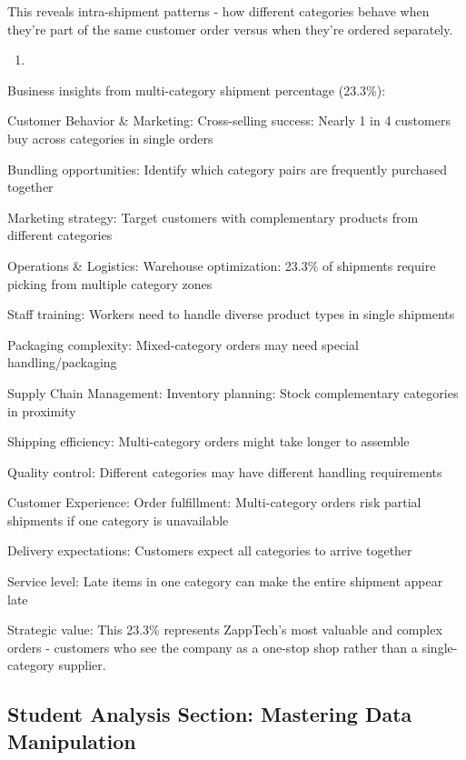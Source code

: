 \documentclass[
  letterpaper,
  DIV=11,
  numbers=noendperiod]{scrartcl}
\providecommand{\tightlist}{%
  \setlength{\itemsep}{0pt}\setlength{\parskip}{0pt}}
\begin{document}
This reveals intra-shipment patterns - how different categories behave
when they're part of the same customer order versus when they're ordered
separately.

\begin{enumerate}
\def\labelenumi{\arabic{enumi}.}
\setcounter{enumi}{2}
\tightlist
\item
\end{enumerate}

Business insights from multi-category shipment percentage (23.3\%):

Customer Behavior \& Marketing: Cross-selling success: Nearly 1 in 4
customers buy across categories in single orders

Bundling opportunities: Identify which category pairs are frequently
purchased together

Marketing strategy: Target customers with complementary products from
different categories

Operations \& Logistics: Warehouse optimization: 23.3\% of shipments
require picking from multiple category zones

Staff training: Workers need to handle diverse product types in single
shipments

Packaging complexity: Mixed-category orders may need special
handling/packaging

Supply Chain Management: Inventory planning: Stock complementary
categories in proximity

Shipping efficiency: Multi-category orders might take longer to assemble

Quality control: Different categories may have different handling
requirements

Customer Experience: Order fulfillment: Multi-category orders risk
partial shipments if one category is unavailable

Delivery expectations: Customers expect all categories to arrive
together

Service level: Late items in one category can make the entire shipment
appear late

Strategic value: This 23.3\% represents ZappTech's most valuable and
complex orders - customers who see the company as a one-stop shop rather
than a single-category supplier.

\subsection{Student Analysis Section: Mastering Data
Manipulation}\label{student-analysis-section}
\end{document}
